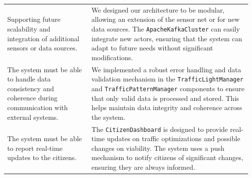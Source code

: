 \documentclass[12pt, a4paper, twoside, openright]{report}
\begin{document}
\begin{longtable}{>{\raggedright\arraybackslash}p{} >{\raggedright\arraybackslash}p{}}
Supporting future scalability and integration of additional sensors or data sources. &
We designed our architecture to be modular, allowing an extension of the sensor net or for new data sources. The \texttt{ApacheKafkaCluster} can easily integrate new actors, ensuring that the system can adapt to future needs without significant modifications. \\

The system must be able to handle data consistency and coherence during communication with external systems. &
We implemented a robust error handling and data validation mechanism in the \texttt{TrafficLightManager} and \texttt{TrafficPatternManager} components to ensure that only valid data is processed and stored. This helps maintain data integrity and coherence across the system. \\

The system must be able to report real-time updates to the citizens. &
The \texttt{CitizenDashboard} is designed to provide real-time updates on traffic optimizations and possible changes on viability. The system uses a push mechanism to notify citizens of significant changes, ensuring they are always informed. \\
\end{longtable}
\end{document}

